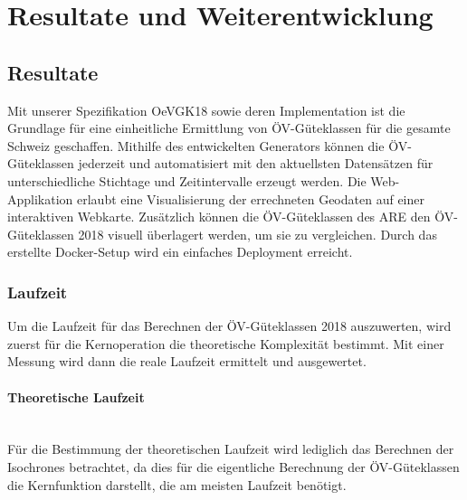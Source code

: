 
\section{Resultate und Weiterentwicklung}
\label{Resultate und Weiterentwicklung}


\subsection{Resultate}
\label{Resultate und Weiterentwicklung:Resultate}

Mit unserer Spezifikation \gls{OeVGK18} sowie deren Implementation ist die Grundlage für eine einheitliche Ermittlung von \gls{ÖV-Güteklassen} für die gesamte Schweiz geschaffen.
Mithilfe des entwickelten Generators können die \gls{ÖV-Güteklassen} jederzeit und automatisiert mit den aktuellsten Datensätzen für unterschiedliche Stichtage und Zeitintervalle erzeugt werden.
Die Web-Applikation erlaubt eine Visualisierung der errechneten Geodaten auf einer interaktiven Webkarte.
Zusätzlich können die \gls{ÖV-Güteklassen} des \ac{ARE} den \gls{ÖV-Güteklassen} 2018 visuell überlagert werden, um sie zu vergleichen.
Durch das erstellte Docker-Setup wird ein einfaches Deployment erreicht.


\subsubsection{Laufzeit}
\label{Resultate und Weiterentwicklung:Laufzeit}

Um die Laufzeit für das Berechnen der \gls{ÖV-Güteklassen} 2018 auszuwerten, wird zuerst für die Kernoperation die theoretische Komplexität bestimmt.
Mit einer Messung wird dann die reale Laufzeit ermittelt und ausgewertet.

\paragraph{Theoretische Laufzeit}\label{Laufzeit:Theoretische Laufzeit}~\\
Für die Bestimmung der theoretischen Laufzeit wird lediglich das Berechnen der \glspl{Isochrone} betrachtet, da dies für die eigentliche Berechnung der \gls{ÖV-Güteklassen} die Kernfunktion darstellt, die am meisten Laufzeit benötigt.

